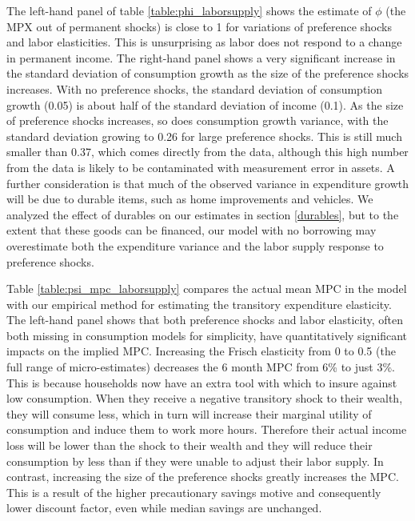 \documentclass[titlepage]{\econtex}\newcommand{\texname}{ConsumptionHeterogeneity}
\begin{document}
The left-hand panel of table \ref{table:phi_laborsupply} shows the estimate of $\phi$ (the MPX out of permanent shocks) is close to 1 for variations of preference shocks and labor elasticities. This is unsurprising as labor does not respond to a change in permanent income. The right-hand panel shows a very significant increase in the standard deviation of consumption growth as the size of the preference shocks increases. With no preference shocks, the standard deviation of consumption growth (0.05) is about half of the standard deviation of income (0.1). As the size of preference shocks increases, so does consumption growth variance, with the standard deviation growing to 0.26 for large preference shocks. This is still much smaller than 0.37, which comes directly from the data, although this high number from the data is likely to be contaminated with measurement error in assets. A further consideration is that much of the observed variance in expenditure growth will be due to durable items, such as home improvements and vehicles. We analyzed the effect of durables on our estimates in section \ref{durables}, but to the extent that these goods can be financed, our model with no borrowing may overestimate both the expenditure variance and the labor supply response to preference shocks.

Table \ref{table:psi_mpc_laborsupply} compares the actual mean MPC in the model with our empirical method for estimating the transitory expenditure elasticity. The left-hand panel shows that both preference shocks and labor elasticity, often both missing in consumption models for simplicity, have quantitatively significant impacts on the implied MPC. Increasing the Frisch elasticity from 0 to 0.5 (the full range of micro-estimates) decreases the 6 month MPC from 6\% to just 3\%. This is because households now have an extra tool with which to insure against low consumption. When they receive a negative transitory shock to their wealth, they will consume less, which in turn will increase their marginal utility of consumption and induce them to work more hours. Therefore their actual income loss will be lower than the shock to their wealth and they will reduce their consumption by less than if they were unable to adjust their labor supply. In contrast, increasing the size of the preference shocks greatly increases the MPC. This is a result of the higher precautionary savings motive and consequently lower discount factor, even while median savings are unchanged.
\end{document}
